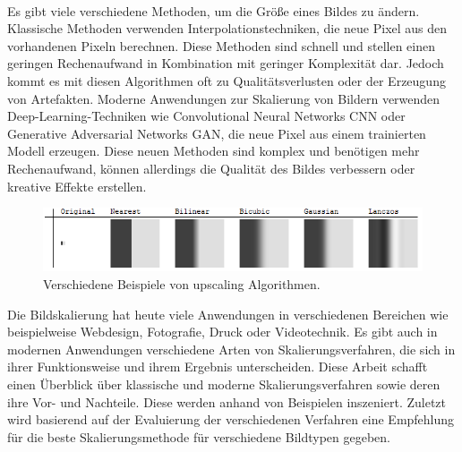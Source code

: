     ~
    
    Es gibt viele verschiedene Methoden, um die Größe eines Bildes zu ändern. 
    Klassische Methoden verwenden Interpolationstechniken, die neue Pixel aus den vorhandenen Pixeln berechnen. 
    Diese Methoden sind schnell und stellen einen geringen Rechenaufwand in Kombination mit geringer Komplexität dar. 
    Jedoch kommt es mit diesen Algorithmen oft zu Qualitätsverlusten oder der Erzeugung von Artefakten. 
    Moderne Anwendungen zur Skalierung von Bildern verwenden Deep-Learning-Techniken wie Convolutional Neural Networks \ac{CNN} oder Generative Adversarial Networks \ac{GAN}, die neue Pixel aus einem trainierten Modell erzeugen. 
    Diese neuen Methoden sind komplex und benötigen mehr Rechenaufwand, können allerdings die Qualität des Bildes verbessern oder kreative Effekte erstellen.
    
    \begin{figure}[h!]
        \vspace{8mm}
        \centering
        \includegraphics{img/xaR8r.png}
        \caption{Verschiedene Beispiele von upscaling Algorithmen\cite{whuber.lanczos}.}
        \label{fig:my_label}
        \vspace{4mm}
    \end{figure}
    
    Die Bildskalierung hat heute viele Anwendungen in verschiedenen Bereichen wie beispielweise Webdesign, Fotografie, Druck oder Videotechnik. 
    Es gibt auch in modernen Anwendungen verschiedene Arten von Skalierungsverfahren, die sich in ihrer Funktionsweise und ihrem Ergebnis unterscheiden. 
    Diese Arbeit schafft einen Überblick über klassische und moderne Skalierungsverfahren sowie deren ihre Vor- und Nachteile. 
    Diese werden anhand von Beispielen inszeniert. 
    Zuletzt wird basierend auf der Evaluierung der verschiedenen Verfahren eine Empfehlung für die beste Skalierungsmethode für verschiedene Bildtypen gegeben. 
    
    ~

